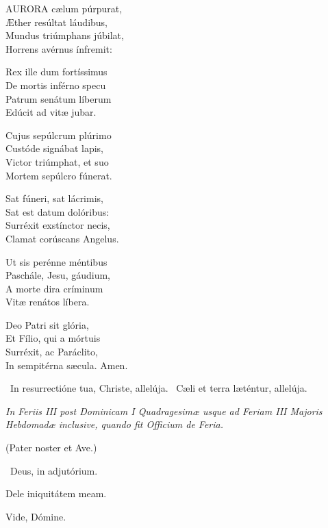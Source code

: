 \lettrine[lines=2]{A}{URORA} cælum púrpurat,\\
Æther resúltat láudibus,\\
Mundus triúmphans júbilat,\\
Horrens avérnus ínfremit:

Rex ille dum fortíssimus\\
De mortis inférno specu\\
Patrum senátum líberum\\
Edúcit ad vitæ jubar.

Cujus sepúlcrum plúrimo\\
Custóde signábat lapis,\\
Victor triúmphat, et suo\\
Mortem sepúlcro fúnerat.

Sat fúneri, sat lácrimis,\\
Sat est datum dolóribus:\\
Surréxit exstínctor necis,\\
Clamat corúscans Angelus.

Ut sis perénne méntibus\\
Paschále, Jesu, gáudium,\\
A morte dira críminum\\
Vitæ renátos líbera.

Deo Patri sit glória,\\
Et Fílio, qui a mórtuis\\
Surréxit, ac Paráclito,\\
In sempitérna sæcula. Amen.

\V\ In resurrectióne tua, Christe, allelúja. \R\ Cæli et terra læténtur, allelúja.



\sectionornament


\textit{In Feriis III post Dominicam I Quadragesimæ usque ad Feriam III Majoris Hebdomadæ inclusive, quando fit Officium de Feria.}

(Pater noster et Ave.)

\V\ Deus, in adjutórium.

 Dele iniquitátem meam.


 Vide, Dómine.


